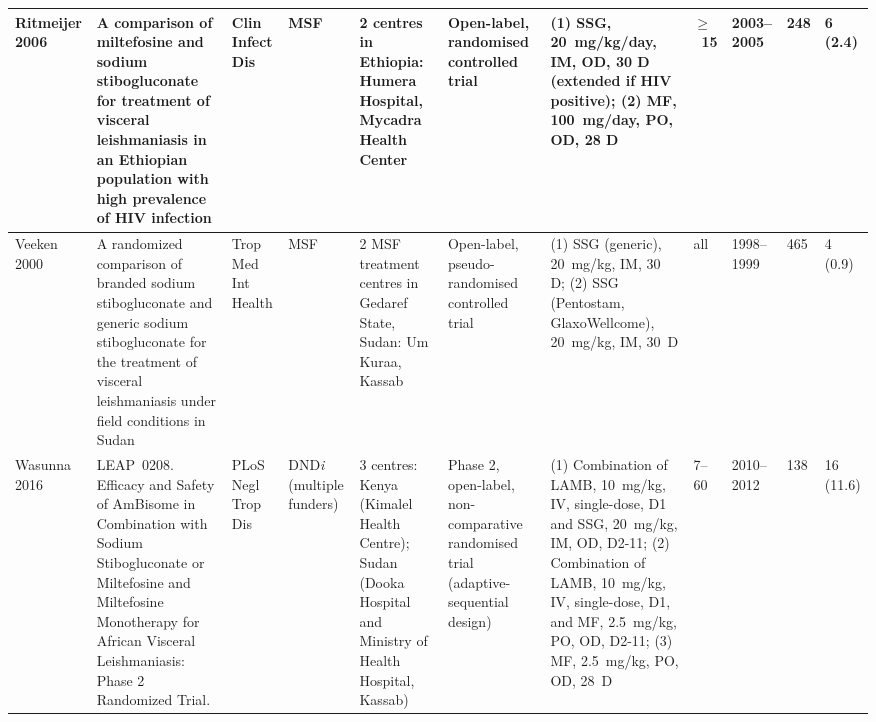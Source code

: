 \begin{ThreePartTable}
\begin{longtable}[c]{L{1cm} L{4cm} L{1cm} L{1.5cm} L{3.5cm} L{2.5cm} L{3.7cm} L{1cm} L{1cm} L{1cm} L{1.3cm}}
    Ritmeijer 2006\cite{ritmeijer2006} & A comparison of miltefosine and sodium stibogluconate for treatment of visceral leishmaniasis in an Ethiopian population with high prevalence of HIV infection                                        & Clin Infect Dis          & MSF                                  & 2 centres in Ethiopia: Humera Hospital, Mycadra Health Center                                                                                                                      & Open-label, randomised controlled trial                                            & (1) SSG, 20~mg/kg/day, IM, OD, 30 D (extended if HIV positive); (2) MF, 100~mg/day, PO, OD, 28 D                                                                                                                            & $\geq$~15   & 2003--2005   & 248       & 6 (2.4)       \\ \midrule
    Veeken 2000\cite{veeken2000}       & A randomized comparison of branded sodium stibogluconate and generic sodium stibogluconate for the treatment of visceral leishmaniasis under field conditions in Sudan                                & Trop Med Int Health      & MSF                                  & 2 MSF treatment centres in Gedaref State, Sudan: Um Kuraa, Kassab                                                                                                                  & Open-label, pseudo-randomised controlled trial                                     & (1) SSG (generic), 20~mg/kg, IM, 30 D; (2) SSG (Pentostam, GlaxoWellcome), 20~mg/kg, IM, 30~D                                                                                                                      & all         & 1998--1999   & 465       & 4 (0.9)       \\ \midrule
    Wasunna 2016\cite{wasunna2016}     & LEAP~0208. Efficacy and Safety of AmBisome in Combination with Sodium Stibogluconate or Miltefosine and Miltefosine Monotherapy for African Visceral Leishmaniasis: Phase 2 Randomized Trial.         & PLoS Negl Trop Dis       & DND\textit{i} (multiple funders)     & 3 centres: Kenya (Kimalel Health Centre); Sudan (Dooka Hospital and Ministry of Health Hospital, Kassab)                                                                           & Phase 2, open-label, non-comparative randomised trial (adaptive-sequential design) & (1) Combination of LAMB, 10~mg/kg, IV, single-dose, D1 and SSG, 20~mg/kg, IM, OD, D2-11; (2) Combination of LAMB, 10~mg/kg, IV, single-dose, D1, and MF, 2.5~mg/kg, PO, OD, D2-11; (3) MF, 2.5~mg/kg, PO, OD, 28~D & 7--60       & 2010--2012   & 138       & 16 (11.6)     \\ \bottomrule
  \end{longtable}
\end{ThreePartTable}
